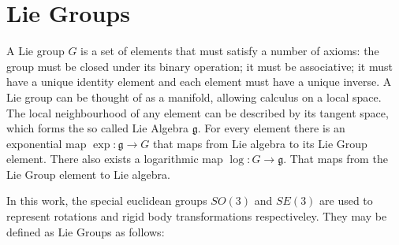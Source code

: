 

\section{Lie Groups}
\label{sec:lie_group}

A Lie group $G$ is a set of elements that must satisfy a number of axioms: the group must be closed under its binary operation; it must be associative; it must have a unique identity element and each element must have a unique inverse. A Lie group can be thought of as a manifold, allowing calculus on a local space.  The local neighbourhood of any element can be described by its tangent space, which forms the so called Lie Algebra $\mathfrak g$.  For every element there is an exponential map $\exp\colon \mathfrak g \to G$ that maps from Lie algebra to its Lie Group element.  There also exists a logarithmic map $\log\colon G \to \mathfrak g$.  That maps from the Lie Group element to Lie algebra.  \cite{Agrawal_06}

In this work, the special euclidean groups $SO(3)$ and $SE(3)$ are used to represent rotations and rigid body transformations respectiveley.  They may be defined as Lie Groups as follows:
 
